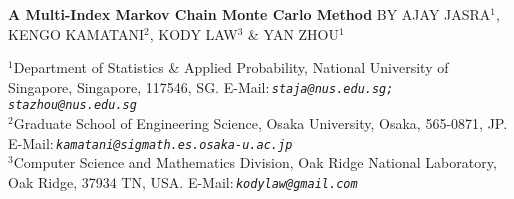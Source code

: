 \documentclass[english]{article}
\begin{document}



\begin{center}

{\Large \textbf{A Multi-Index Markov Chain Monte Carlo Method}}
%
%
BY AJAY JASRA$^{1}$, KENGO KAMATANI$^{2}$, KODY LAW$^{3}$ \& YAN ZHOU$^{1}$




{\footnotesize $^{1}$Department of Statistics \& Applied Probability,
National University of Singapore, Singapore, 117546, SG.}
{\footnotesize E-Mail:\,}\texttt{\emph{\footnotesize staja@nus.edu.sg; stazhou@nus.edu.sg}}\\
{\footnotesize $^{2}$Graduate School of Engineering Science, Osaka University, Osaka, 565-0871, JP.}
{\footnotesize E-Mail:\,}\texttt{\emph{\footnotesize kamatani@sigmath.es.osaka-u.ac.jp}}\\
{\footnotesize $^{3}$Computer Science and Mathematics Division,
Oak Ridge National Laboratory,  Oak Ridge, 37934 TN, USA.}
{\footnotesize E-Mail:\,}\texttt{\emph{\footnotesize kodylaw@gmail.com}}
\end{center}



\end{document}

